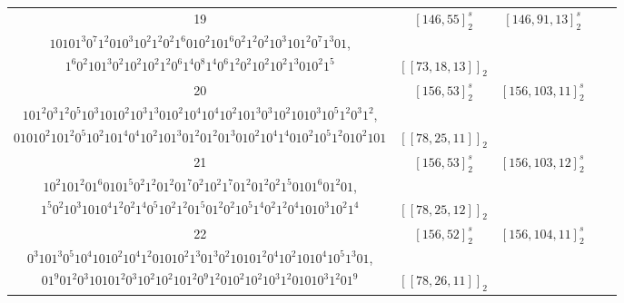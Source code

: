 \documentclass[journal]{IEEEtran}
\begin{document}
\begin{table}[!t]
\begin{tabular}{ccccc}
		19  & $[146, 55]_2^s$ & $[146, 91,13]_2^s$  &                                                                                                     \makecell[c]{$1^{2}0^{3}10^{2}1^{3}0^{4}1^{2}01$,\\$10101^{3}0^{7}1^{2}010^{3}10^{2}1^{2}0^{2}1^{6}010^{2}101^{6}0^{2}1^{2}0^{2}10^{3}101^{2}0^{7}1^{3}01$,\\$1^{6}0^{2}101^{3}0^{2}10^{2}10^{2}1^{2}0^{6}1^{4}0^{8}1^{4}0^{6}1^{2}0^{2}10^{2}10^{2}1^{3}010^{2}1^5$}                                                                                                     & $[[73,18,13]]_2$ \\
		20  & $[156, 53]_2^s$ & $[156, 103,11]_2^s$ &                                                                                         \makecell[c]{$10101010^{7}10101010^{3}1$,\\$101^{2}0^{3}1^{2}0^{5}10^{3}1010^{2}10^{3}1^{3}010^{2}10^{4}10^{4}10^{2}101^{3}0^{3}10^{2}1010^{3}10^{5}1^{2}0^{3}1^2$,\\$01010^{2}101^{2}0^{5}10^{2}101^{4}0^{4}10^{2}101^{3}01^{2}01^{2}01^{3}010^{2}10^{4}1^{4}010^{2}10^{5}1^{2}010^{2}101$}                                                                                          & $[[78,25,11]]_2$ \\
		21  & $[156, 53]_2^s$ & $[156, 103,12]_2^s$ &                                                                                                 \makecell[c]{$10101010^{7}10101010^{3}1$,\\$10^{2}101^{2}01^{6}0101^{5}0^{2}1^{2}01^{2}01^{7}0^{2}10^{2}1^{7}01^{2}01^{2}0^{2}1^{5}0101^{6}01^{2}01$,\\$1^{5}0^{2}10^{3}1010^{4}1^{2}0^{2}1^{4}0^{5}10^{2}1^{2}01^{5}01^{2}0^{2}10^{5}1^{4}0^{2}1^{2}0^{4}1010^{3}10^{2}1^4$}                                                                                                 & $[[78,25,12]]_2$ \\
		22  & $[156, 52]_2^s$ & $[156, 104,11]_2^s$ &                                                                                                     \makecell[c]{$10101010^{7}10101010^{3}1$,\\$0^{3}101^{3}0^{5}10^{4}1010^{2}10^{4}1^{2}01010^{2}1^{3}01^{3}0^{2}10101^{2}0^{4}10^{2}1010^{4}10^{5}1^{3}01$,\\$01^{9}01^{2}0^{3}10101^{2}0^{3}10^{2}10^{2}101^{2}0^{9}1^{2}010^{2}10^{2}10^{3}1^{2}01010^{3}1^{2}01^9$}                                                                                                     & $[[78,26,11]]_2$ \\

\end{tabular}
\end{table}
\end{document}
